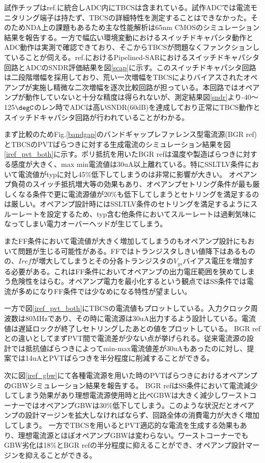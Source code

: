 \documentclass[letterpaper, 10 pt, conference]{ieeeconf}  %
\begin{document}
試作チップはref.\cite{yoshioka201728}に統合しADC内にTBCSは含まれている。試作ADCでは電流モニタリング端子は持たず、TBCSの詳細特性を測定することはできなかった。そのためNDA上の課題もあるため主な性能解析は65nm CMOSのシミュレーション結果を報告する。一方で幅広い環境変動におけるスイッチドキャパシタ動作とADC動作は実測で確認できており、そこからTBCSが問題なくファンクションしていることが伺える。ref.\cite{yoshioka201728}におけるPipelined-SARにおけるスイッチドキャパシタ回路とADCのSNDR評価結果を図\ref{scap}に示す。このスイッチドキャパシタ回路は二段階増幅を採用しており、荒い一次増幅をTBCSによりバイアスされたオペアンプが実施し精微な二次増幅を逐次比較回路が担っている。本回路ではオペアンプが動作していないと十分な精度は得られないが、測定結果図\ref{sndr}より-40～125$\degC$のレン時でADCは高いSNDR(60dB)を達成しており正常にTBCS動作とスイッチドキャパシタ回路が行われていることがわかる。

まず比較のためFig.\ref{bandgap}のバンドギャップレファレンス型電流源(BGR ref)\cite{banba1999cmos}とTBCSのPVTばらつきに対する生成電流のシミュレーション結果を図\ref{iref_pvt_both}に示す。ポリ抵抗を用いたBGR refは温度や製造ばらつきに対する感度が大きく、max min電流値は30uA以上離れている。特にSSLTLV条件において電流値がtypに対し45\%低下してしまうのは非常に影響が大きい。
オペアンプ負荷のスイッチ抵抗増大等の効果もあり、オペアンプセトリング条件が最も厳しくなる条件で更に電流源値が20\%も低下してしまうとセトリングを満足するのは厳しい。オペアンプ設計時にはSSLTLV条件のセトリングを満足するようにスルーレートを設定するため、typ含む他条件においてスルーレートは過剰気味になってしまい電力オーバーヘッドが生じてしまう。

またFF条件において電流値が大きく増加してしまうのもオペアンプ設計にもおいて問題が生じる可能性がある。FFではトランジスタしきい値降下はあるものの、$I{ref}$が増大してしまうとその分各トランジスタの$V_{gs}$バイアス電圧を増加する必要がある。これはFF条件においてオペアンプの出力電圧範囲を狭めてしまう危険性をはらむ。オペアンプ電力を最小化するという観点ではSS条件では電流が多めになりFF条件では少なめになる特性が望ましい。

一方で図\ref{iref_pvt_both}にTBCSの電流値もプロットしている。入力クロック周波数は80MHzであり、その時に電流源は30uA出力するよう設計している。電流値は遅延ロックが終了しセトリングしたあとの値をプロットしている。
BGR refとの違いとしてまずPVT間で電流差が少ない点が挙げられる。従来電流源の設計では抵抗値ばらつきによってmin-max電流値差が30uAもあったのに対し、提案では14uAとPVTばらつきを半分程度に削減することができる。

次に図\ref{iref_gbw}にて各種電流源を用いた時のPVTばらつきにおけるオペアンプのGBWシミュレーション結果を報告する。
BGR refはSS条件において電流減少してしまう効果があり理想電流源使用時と比べGBWは大きく減少しワーストコーナーではオペアンプGBWは30\%低下してしまう。このような状況だとオペアンプの設計マージンを拡大しなければならず、回路全体の消費電力が大きく増加してしまう。
一方でTBCSを用いるとPVT適応的な電流を生成する効果もあり、理想電流源とほぼオペアンプGBWは変わらない。ワーストコーナーでもGBW劣化は18\%とBGR refの半分程度に抑えることができ、オペアンプ設計マージンを抑えることができる。
\end{document}
